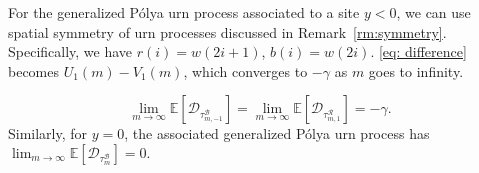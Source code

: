 \documentclass[EJP]{ejpecp} %
\begin{document}
For the generalized P\'{o}lya urn process associated to a site $y<0$, we can use spatial symmetry of urn processes discussed in Remark~\ref{rm:symmetry}. Specifically, we have $r(i) = w(2i+1)$, $b(i) =w(2i)$. \eqref{eq: difference} becomes $U_1(m)-V_1(m)$, which converges to $-\gamma$ as $m$ goes to infinity.

\begin{equation}\label{eq: general expected drift}
	\lim_{m\to\infty}\mathbb{E}\left[ \mathcal{D}_{\tau^{\mathcal{B}}_{m,-1}} \right] = \lim_{m\to\infty}\mathbb{E}\left[ \mathcal{D}_{\tau^{\mathcal{R}}_{m,1}} \right] = -\gamma.
\end{equation}
Similarly, for $y=0$, the associated generalized P\'{o}lya urn process has 
$\lim_{m\to\infty}\mathbb{E}\left[ \mathcal{D}_{\tau^{\mathcal{B}}_m} \right] = 0.$
\end{document}
